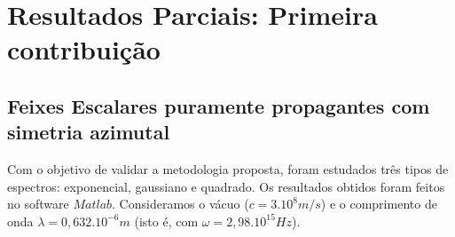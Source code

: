 \chapter{Resultados Parciais: Primeira contribui\c{c}\~ao}

\section{Feixes Escalares puramente propagantes com simetria azimutal}
Com o objetivo de validar a metodologia proposta, foram estudados tr\^es tipos de espectros: exponencial, gaussiano e quadrado. Os resultados obtidos foram feitos no software $Matlab$. Consideramos o v\'acuo ($c=3.10^8 m/s$) e o comprimento de onda $\lambda = 0,632.10^{-6}m$ (isto \'e, com $\omega = 2,98.10^{15}Hz$). 
